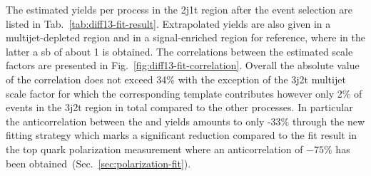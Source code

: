 The estimated yields per process in the 2j1t region after the event selection are listed in Tab.~\ref{tab:diff13-fit-result}. Extrapolated yields are also given in a multijet-depleted region and in a signal-enriched region for reference, where in the latter a \gls{sb} of about 1 is obtained. The correlations between the estimated scale factors are presented in Fig.~\ref{fig:diff13-fit-correlation}. Overall the absolute value of the correlation does not exceed 34\% with the exception of the 3j2t multijet scale factor for which the corresponding template contributes however only 2\% of events in the 3j2t region in total compared to the other processes. In particular the anticorrelation between the \wjets and \ttbar yields amounts to only -33\% through the new fitting strategy which marks a significant reduction compared to the fit result in the top quark polarization measurement where an anticorrelation of $-75\%$ has been obtained~(Sec.~\ref{sec:polarization-fit}).


